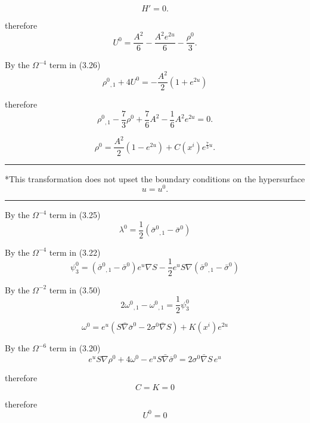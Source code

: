 \[
H'=0.
\]

therefore
\[
U^0
=
\frac{A^2}{6}
-
\frac{A^2e^{2u}}{6}
-
\frac{\rho^0}{3}.
\]

By the $\Omega^{-4}$ term in (3.26)
\begin{equation}
\rho^0{}_{,1}
+
4U^0
=
-\frac{A^2}{2}
\left(1+e^{2u}\right)
\tag{7.9}
\end{equation}

therefore
\[
\rho^0{}_{,1}
-
\frac{7}{3}\rho^0
+
\frac{7}{6}A^2
-
\frac{1}{6}A^2e^{2u}
=
0.
\]

\begin{equation}
\rho^0
=
\frac{A^2}{2}
\left(1-e^{2u}\right)
+
C(x^i)e^{\frac{7}{3}u}.
\tag{7.10}
\end{equation}

\bigskip
\hrule
\medskip

\noindent
*This transformation does not upset the boundary conditions
on the hypersurface
\[
u=u^0.
\]

\medskip
\hrule
By the $\Omega^{-4}$ term in (3.25)
\begin{equation}
\lambda^0
=
\frac{1}{2}
\left(
\bar{\sigma}^0{}_{,1}
-
\bar{\sigma}^0
\right)
\tag{7.11}
\end{equation}

By the $\Omega^{-4}$ term in (3.22)
\begin{equation}
\psi_3^0
=
\left(
\bar{\sigma}^0{}_{,1}
-
\bar{\sigma}^0
\right)e^u \nabla S
-
\frac{1}{2}e^u S
\nabla
\left(
\bar{\sigma}^0{}_{,1}
-
\bar{\sigma}^0
\right)
\tag{7.12}
\end{equation}

By the $\Omega^{-2}$ term in (3.50)
\[
2\omega^0{}_{,1}
-
\omega^0{}_{,1}
=
\frac{1}{2}\psi_3^0
\]

\begin{equation}
\omega^0
=
e^u
\left(
S\bar{\nabla}\bar{\sigma}^0
-
2\sigma^0\bar{\nabla}S
\right)
+
K(x^i)e^{2u}
\tag{7.13}
\end{equation}

By the $\Omega^{-6}$ term in (3.20)
\[
e^u S\nabla\rho^0
+
4\omega^0
-
e^u S\bar{\nabla}\bar{\sigma}^0
=
2\sigma^0\bar{\nabla}S\,e^u
\]

therefore
\begin{equation}
C=K=0
\tag{7.14}
\end{equation}

therefore
\begin{equation}
U^0=0
\tag{7.15}
\end{equation}

